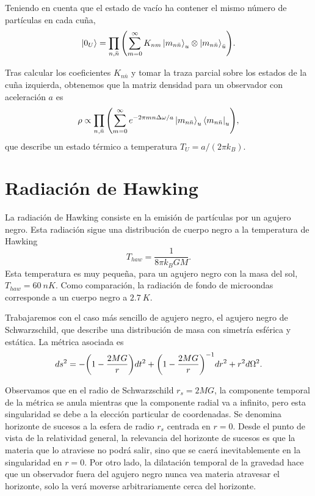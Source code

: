 Teniendo en cuenta que el estado de vacío ha contener el mismo número de partículas en cada cuña,
\begin{equation}
  \ket{0_U} = \prod_{n,\bar n} \qty(\sum_{m=0}^\infty K_{nm} \ket{m_{n\bar n}}_u\otimes \ket{m_{n\bar n}}_{\bar u}).
\end{equation}

Tras calcular los coeficientes $K_{n \bar n}$ y tomar la traza parcial sobre los estados de
la cuña izquierda, obtenemos que la matriz densidad para un observador con aceleración $a$ es
\begin{equation}
  \rho  \propto \prod_{n,\bar n} \qty(\sum_{m=0}^\infty e^{-2\pi m n\Delta  \omega/a}\ket{m_{n\bar n}}_u \bra{m_{n\bar n}}_u),
\end{equation}
que describe un estado térmico a temperatura $T_U=a/(2\pi k_B)$.

\section{Radiación de Hawking}
La radiación de Hawking consiste en la emisión de partículas por un agujero negro.
Esta radiación sigue una distribución de cuerpo negro a la temperatura de Hawking
\begin{equation}
  T_{haw}= \frac{1}{8\pi k_B G M}.
\end{equation}
Esta temperatura es muy pequeña, para un agujero negro con la masa del sol, $T_{haw}=\SI{60}{nK}$.
Como comparación, la radiación de fondo de microondas corresponde a un cuerpo negro a $\SI{2.7}{K}$.

Trabajaremos con el caso más sencillo de agujero negro, el agujero negro de Schwarzschild, que
describe una distribución de masa con simetría esférica y estática. La métrica asociada
es 
\begin{equation}
  ds^2= -\qty(1-\frac{2MG}{r})dt^2+\qty(1-\frac{2MG}{r})^{-1}dr^2+r^2d\Omega^2.
\end{equation}

Observamos que en el radio de Schwarzschild $r_s=2MG$, la componente temporal de la 
métrica se anula mientras que la componente radial va a infinito, pero esta singularidad se debe
a la elección particular de coordenadas.
Se denomina horizonte de sucesos a la esfera de radio $r_s$ centrada en $r=0$.
Desde el punto de vista de la relatividad general, la  relevancia del horizonte de sucesos es
que la materia que lo atraviese no podrá salir, sino que se caerá inevitablemente en la singularidad en $r=0$.
Por otro lado, la dilatación temporal de la gravedad  hace que un observador fuera del agujero negro nunca
vea materia atravesar el horizonte, solo la verá moverse arbitrariamente cerca del horizonte.

